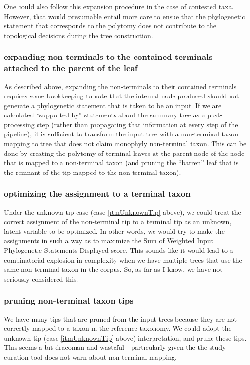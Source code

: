 \documentclass[11pt]{article}
\newcommand{\ps}{phylogenetic statement\xspace}
\newcommand{\PSs}{Phylogenetic Statements\xspace}
\newcommand{\SWIPSD}{Sum of Weighted Input \PSs Displayed\xspace}
\begin{document}
One could also follow this expansion procedure in the case of contested taxa.
However, that would presumable entail more care to ensue that the \ps that corresponds
    to the polytomy does not contribute to the topological decisions during the 
    tree construction.

\subsubsection{expanding non-terminals to the contained terminals attached to the parent of the leaf}\label{expandNonTermPar}
As described above, expanding the non-terminals to their contained terminals requires 
    some bookkeeping to note that the internal node produced should not generate a \ps that
    is taken to be an input.
If we are calculated ``supported by'' statements about the summary tree as a post-processing step (rather
    than propagating that information at every step of the pipeline), it is sufficient
    to transform the input tree with a non-terminal taxon mapping to tree that does not
    claim monophyly non-terminal taxon.
This can be done by creating the polytomy of terminal leaves at the parent node of the node that is
    mapped to a non-terminal taxon (and pruning the ``barren'' leaf that is the remnant of the tip
    mapped to the non-terminal taxon).

\subsubsection{optimizing the assignment to a terminal taxon}
Under the unknown tip case (case \ref{itmUnknownTip} above), we could treat the
    correct assignment of the non-terminal tip to a terminal tip as an
    unknown, latent variable to be optimized.
In other words, we would try to make the assignments in such a way as to
    maximize the \SWIPSD score.
This sounds like it would lead to a combinatorial explosion in complexity when 
    we have multiple trees that use the same non-terminal taxon in the corpus.
So, as far as I know, we have not seriously considered this.

\subsubsection{pruning non-terminal taxon tips}
We have many tips that are pruned from the input trees because they are 
    not correctly mapped to a taxon in the reference taxonomy.
We could adopt the unknown tip (case \ref{itmUnknownTip} above) interpretation,
    and prune these tips.
This seems a bit draconian and wasteful - particularly given the the study
    curation tool does not warn about non-terminal mapping.
\end{document}

